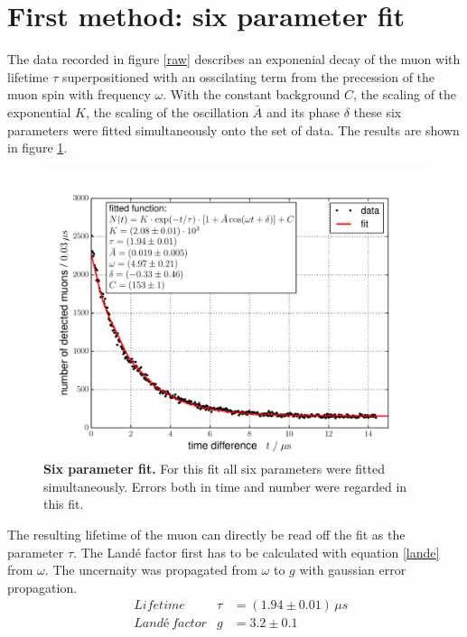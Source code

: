 \documentclass{include/thesisclass3}
\newcommand{\e}[1]{\,\si{#1}}
\begin{document}
\section{First method: six parameter fit}
\label{first}
The data recorded in figure \ref{raw} describes an exponenial decay of the muon with lifetime $\tau$ superpositioned with an osscilating term from the precession of the muon spin with frequency $\omega$. 
With the constant background $C$, the scaling of the exponential $K$, the scaling of the oscillation $\bar A$ and its phase $\delta$ these six parameters were fitted simultaneously onto the set of data. The results are shown in figure \ref{6pm}.
\begin{figure}[H]
\centering
\includegraphics[width= 0.8 \textwidth]{images/6paramfit.pdf}
\caption{\label{6pm}\textbf{Six parameter fit.} For this fit all six parameters were fitted simultaneously. Errors both in time and number were regarded in this fit.}
\end{figure}
The resulting lifetime of the muon can directly be read off the fit as the parameter $\tau$. 
The Landé factor first has to be calculated with equation \ref{lande} from $\omega$.
The uncernaity was propagated from $\omega$ to $g$ with gaussian error propagation.
\begin{align}
&\e{Lifetime} &\tau &=(1.94\pm 0.01)\e{\mu s}\\
&\e{Landé~factor} &g &=3.2 \pm 0.1
\end{align}
\end{document}
